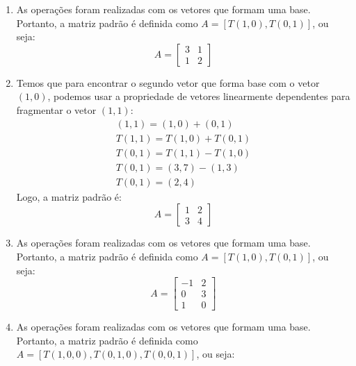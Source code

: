 \begin{resolution}
  \vspace{-24pt}
  \begin{enumerate}[label=\alph*)]
    \item As operações foram realizadas com os vetores que formam uma base. Portanto, a matriz padrão é definida como $A = [T(1,0), T(0,1)]$, ou seja:
          \begin{equation}
            A = \begin{bmatrix}
              3 & 1 \\
              1 & 2
            \end{bmatrix}
          \end{equation}
    \item Temos que para encontrar o segundo vetor que forma base com o vetor $(1,0)$, podemos usar a propriedade de vetores linearmente dependentes para fragmentar o vetor $(1,1)$:
          \begin{gather}
            (1, 1) = (1, 0) + (0, 1) \\
            T(1,1) = T(1,0) + T(0,1) \\
            T(0,1) = T(1,1) - T(1,0) \\
            T(0,1) = (3, 7) - (1, 3) \\
            T(0,1) = (2, 4)
          \end{gather}
          Logo, a matriz padrão é:
          \begin{equation}
            A = \begin{bmatrix}
              1 & 2 \\
              3 & 4
            \end{bmatrix}
          \end{equation}
    \item As operações foram realizadas com os vetores que formam uma base. Portanto, a matriz padrão é definida como $A = [T(1,0), T(0,1)]$, ou seja:
          \begin{equation}
            A = \begin{bmatrix}
              -1 & 2 \\
              0  & 3 \\
              1  & 0
            \end{bmatrix}
          \end{equation}
    \item As operações foram realizadas com os vetores que formam uma base. Portanto, a matriz padrão é definida como $A = [T(1,0, 0), T(0,1, 0), T(0, 0, 1)]$, ou seja:

\end{enumerate}
\end{resolution}
